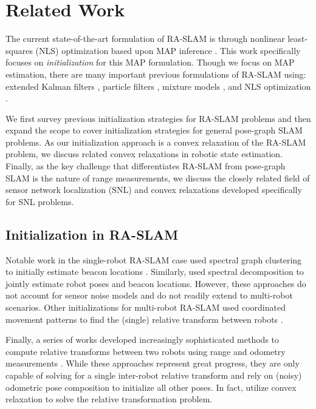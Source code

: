 \section{Related Work}

The current state-of-the-art formulation of RA-SLAM is through nonlinear
least-squares (NLS) optimization based upon MAP inference
\cite{dellaert2017factor}. This work specifically focuses on
\textit{initialization} for this MAP formulation. Though we focus on MAP
estimation, there are many important previous formulations of RA-SLAM using:
extended Kalman filters \cite{Newman03icra, menegatti09icra,
Djugash09iros,djugash09springer}, particle filters \cite{gonzalez09ras,
blanco08icra}, mixture models \cite{blanco08iros}, and NLS optimization
\cite{boroson20iros, funabiki21ral, herranz14icra}.

We first survey previous initialization strategies for RA-SLAM problems and then
expand the scope to cover initialization strategies for general pose-graph SLAM
problems. As our initialization approach is a convex relaxation of the RA-SLAM
problem, we discuss related convex relaxations in robotic state estimation.
Finally, as the key challenge that differentiates RA-SLAM from pose-graph SLAM
is the nature of range measurements, we discuss the closely related field of
sensor network localization (SNL) and convex relaxations developed specifically
for SNL problems.

\subsection{Initialization in RA-SLAM}

Notable work in the single-robot RA-SLAM case used spectral graph clustering to
initially estimate beacon locations \cite{Olson06joe}. Similarly,
\cite{boots13icml} used spectral decomposition to jointly estimate robot poses
and beacon locations. However, these approaches \cite{Olson06joe,boots13icml} do
not account for sensor noise models and do not readily extend to multi-robot
scenarios. Other initializations for multi-robot RA-SLAM used coordinated
movement patterns to find the (single) relative transform between robots
\cite{guo2017ijmav,li20arxiv}.

Finally, a series of works developed increasingly sophisticated methods to
compute relative transforms between two robots using range and odometry
measurements
\cite{zhou08tro,trawny07iros,trawny10rss,trawny10tro,jiang20itaes,li20iros,Li2022ral}.
While these approaches represent great progress, they are only capable of
solving for a single inter-robot relative transform and rely on (noisy)
odometric pose composition to initialize all other poses. In fact,
\cite{jiang20itaes,li20iros,Li2022ral} utilize convex relaxation to solve the
relative transformation problem.

